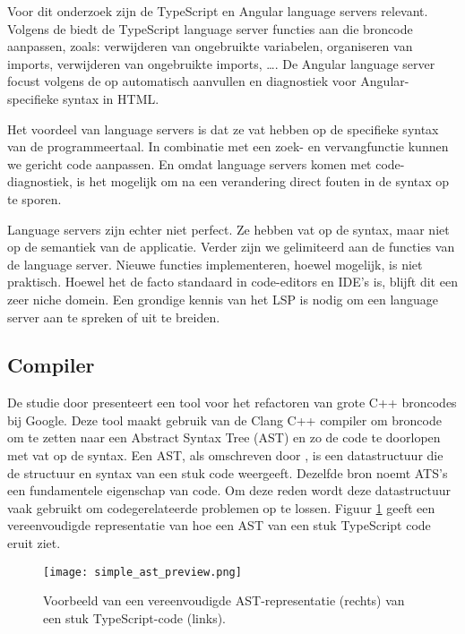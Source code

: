 Voor dit onderzoek zijn de TypeScript en Angular language servers relevant.
Volgens de \textcite{TypeScriptLS2025} biedt de TypeScript language server functies aan die broncode aanpassen, zoals: verwijderen van ongebruikte variabelen, organiseren van imports, verwijderen van ongebruikte imports, \dots.
De Angular language server focust volgens de \textcite{AngularLS2025} op automatisch aanvullen en diagnostiek voor Angular-specifieke syntax in HTML.

Het voordeel van language servers is dat ze vat hebben op de specifieke syntax van de programmeertaal.
In combinatie met een zoek- en vervangfunctie kunnen we gericht code aanpassen.
En omdat language servers komen met code-diagnostiek, is het mogelijk om na een verandering direct fouten in de syntax op te sporen.

Language servers zijn echter niet perfect.
Ze hebben vat op de syntax, maar niet op de semantiek van de applicatie.
Verder zijn we gelimiteerd aan de functies van de language server.
Nieuwe functies implementeren, hoewel mogelijk, is niet praktisch.
Hoewel het de facto standaard in code-editors en IDE's is, blijft dit een zeer niche domein.
Een grondige kennis van het LSP is nodig om een language server aan te spreken of uit te breiden.

\subsection{Compiler}
\label{ch:stand-van-zaken:refactoring:compiler}

De studie door \textcite{Wright2013} presenteert een tool voor het refactoren van grote C++ broncodes bij Google.
Deze tool maakt gebruik van de Clang C++ compiler om broncode om te zetten naar een Abstract Syntax Tree (AST) en zo de code te doorlopen met vat op de syntax.
Een AST, als omschreven door \textcite{Sun2023}, is een datastructuur die de structuur en syntax van een stuk code weergeeft.
Dezelfde bron noemt ATS's een fundamentele eigenschap van code.
Om deze reden wordt deze datastructuur vaak gebruikt om codegerelateerde problemen op te lossen.
Figuur \ref{fig:ast-preview} geeft een vereenvoudigde representatie van hoe een AST van een stuk TypeScript code eruit ziet.

\begin{figure}
  \centering
  \texttt{[image: simple\_ast\_preview.png]}
  \caption[Vereenvoudigde AST]{\label{fig:ast-preview}Voorbeeld van een vereenvoudigde AST-representatie (rechts) van een stuk TypeScript-code (links).}
\end{figure}


